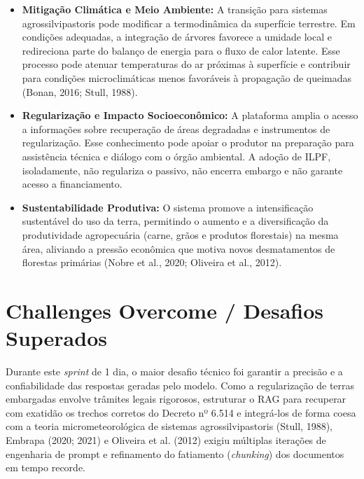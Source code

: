 \documentclass[12pt,a4paper]{article}
\begin{document}
\begin{itemize}
    \item \textbf{Mitigação Climática e Meio Ambiente:} A transição para sistemas agrossilvipastoris pode modificar a termodinâmica da superfície terrestre. Em condições adequadas, a integração de árvores favorece a umidade local e redireciona parte do balanço de energia para o fluxo de calor latente. Esse processo pode atenuar temperaturas do ar próximas à superfície e contribuir para condições microclimáticas menos favoráveis à propagação de queimadas (Bonan, 2016; Stull, 1988).
    \item \textbf{Regularização e Impacto Socioeconômico:} A plataforma amplia o acesso a informações sobre recuperação de áreas degradadas e instrumentos de regularização. Esse conhecimento pode apoiar o produtor na preparação para assistência técnica e diálogo com o órgão ambiental. A adoção de ILPF, isoladamente, não regulariza o passivo, não encerra embargo e não garante acesso a financiamento.
    \item \textbf{Sustentabilidade Produtiva:} O sistema promove a intensificação sustentável do uso da terra, permitindo o aumento e a diversificação da produtividade agropecuária (carne, grãos e produtos florestais) na mesma área, aliviando a pressão econômica que motiva novos desmatamentos de florestas primárias (Nobre et al., 2020; Oliveira et al., 2012).
\end{itemize}

\section{Challenges Overcome / Desafios Superados}

Durante este \textit{sprint} de 1 dia, o maior desafio técnico foi garantir a precisão e a confiabilidade das respostas geradas pelo modelo. Como a regularização de terras embargadas envolve trâmites legais rigorosos, estruturar o RAG para recuperar com exatidão os trechos corretos do Decreto nº 6.514 e integrá-los de forma coesa com a teoria micrometeorológica de sistemas agrossilvipastoris (Stull, 1988), Embrapa (2020; 2021) e Oliveira et al. (2012) exigiu múltiplas iterações de engenharia de prompt e refinamento do fatiamento (\textit{chunking}) dos documentos em tempo recorde.
\end{document}
